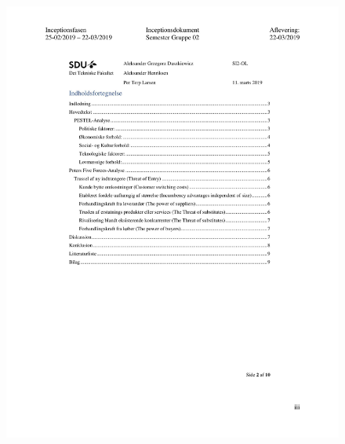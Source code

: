 \begin{figure}[hb]
  \includegraphics[scale = 0.33]{./PNG/Inceptions/Gruppe02+InceptionsDokument-36.jpg} 
\end{figure}

